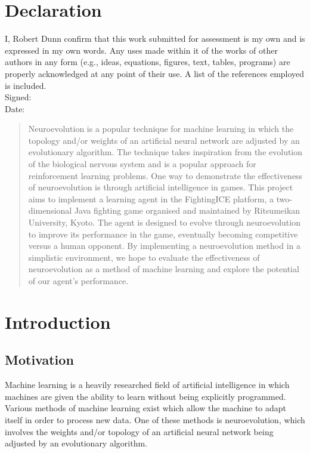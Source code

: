 \documentclass[11pt,a4paper]{article}
\begin{document}
\section*{Declaration}
I,  Robert Dunn confirm that this work submitted for assessment is my own and is expressed
in my own words. Any uses made within it of the works of other authors in any
form (e.g., ideas, equations, figures, text, tables, programs) are properly acknowledged
at any point of their use. A list of the references employed is included.\\
Signed:\\
Date: 
\newpage
\thispagestyle{empty}
\begin{abstract}
Neuroevolution is a popular technique for machine learning in which the topology and/or weights of an artificial neural network are adjusted by an evolutionary algorithm. The technique takes inspiration from the evolution of the biological nervous system and is a popular approach for reinforcement learning problems. One way to demonstrate the effectiveness of neuroevolution is through artificial intelligence in games. This project aims to implement a learning agent in the FightingICE platform, a two-dimensional Java fighting game organised and maintained by Ritsumeikan University, Kyoto. The agent is designed to evolve through neuroevolution to improve its performance in the game, eventually becoming competitive versus a human opponent. By implementing a neuroevolution method in a simplistic environment, we hope to evaluate the effectiveness of neuroevolution as a method of machine learning and explore the potential of our agent's performance.
\end{abstract}
\newpage
\thispagestyle{empty}
\tableofcontents
\newpage
\section{Introduction}
\subsection{Motivation}
Machine learning is a heavily researched field of artificial intelligence in which machines are given the ability to learn without being explicitly programmed. Various methods of machine learning exist which allow the machine to adapt itself in order to process new data. One of these methods is neuroevolution, which involves the weights and/or topology of an artificial neural network being adjusted by an evolutionary algorithm.\\
\end{document}
